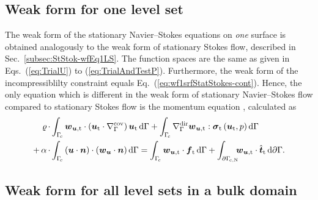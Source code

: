 \documentclass[12pt, twoside, english]{article}
\numberwithin{equation}{section}
\newcommand{\vek}[1]{\mathchoice{\displaystyle\boldsymbol#1}
{\textstyle\boldsymbol#1}{\scriptstyle\boldsymbol#1}
{\scriptscriptstyle\boldsymbol#1}}
\newcommand{\ti}{ \ensuremath{\mathrm{t} }}
\begin{document}
\subsection{Weak form for one level set}\label{subsec:stNSEQ-wfEq1LS}

The weak form of the stationary Navier--Stokes equations on \emph{one} surface is obtained analogously to the weak form of stationary Stokes flow, described in Sec.~\ref{subsec:StStok-wfEq1LS}. The function spaces are the same as given in Eqs.~(\ref{eq:TrialU}) to (\ref{eq:TrialAndTestP}). Furthermore, the weak form of the incompressiblilty constraint equals Eq.~(\ref{eq:wf1srfStatStokes-cont}). Hence, the only equation which is different in the weak form of stationary Navier--Stokes flow compared to stationary Stokes flow is the momentum equation \cite{Fries_2018a}, calculated as
\begin{align}
	\begin{split}
		\varrho\,\cdot&\int_{\Gamma_{\!c}}\vek{w}_{\vek{u},\ti}\cdot\left(\vek{u}_\ti\cdot\nabla_{\Gamma}^{\mathrm{cov}}\right)\vek{u}_\ti\,\mathrm{d}\Gamma+\int_{\Gamma_{\!c}}\nabla_{\Gamma}^{\mathrm{dir}}\vek{w}_{\vek{u},\ti}:\vek{\sigma}_\ti\left(\vek{u}_\ti,p\right)\mathrm{d}\Gamma \\ + \,\alpha\, \cdot &\int_{\Gamma_{\!c}} \left(\vek{u} \cdot \vek{n} \right) \cdot \left(\vek{w}_{\boldsymbol{u}} \cdot \vek{n} \right) \mathrm{d}\Gamma
		=\int_{\Gamma_{\!c}}\vek{w}_{\vek{u},\ti}\cdot\vek{f}_\ti\,\mathrm{d}\Gamma+\int_{\partial\Gamma_{\!c,\mathrm{N}}}\!\!\!\vek{w}_{\vek{u},\ti}\cdot\hat{\vek{t}}_\ti\,\mathrm{d}\partial\Gamma.
	\end{split}
\end{align}

\subsection{Weak form for all level sets in a bulk domain}\label{subsec:StNSEQ-wfEqAllLS}
\end{document}
